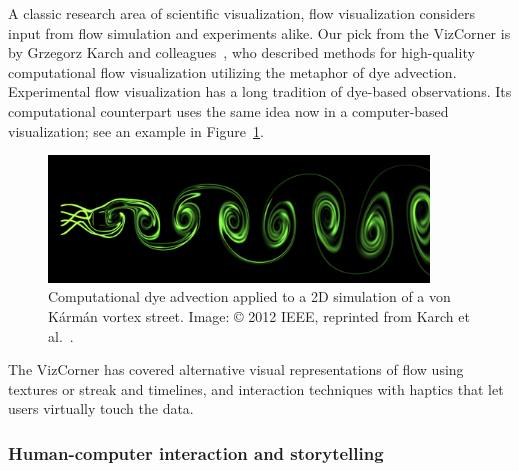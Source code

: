 \documentclass[10pt,journal,compsoc]{IEEEtran}
\begin{document}
A classic research area of scientific visualization, flow visualization considers input from flow simulation and experiments alike. Our pick from the VizCorner is by Grzegorz Karch and colleagues~\cite{Karch2012}, who described methods for high-quality computational flow visualization utilizing the metaphor of dye advection. Experimental flow visualization has a long tradition of dye-based observations. Its computational counterpart uses the same idea now in a computer-based visualization; see an example in Figure~\ref{fig:karman}. 

\begin{figure}
	\begin{center}	
		\includegraphics[width=0.9\textwidth]{karman_weno3.png}
		\caption{Computational dye advection applied to a 2D simulation of a von K{\'a}rm{\'a}n vortex street. Image: \copyright{} 2012 IEEE, reprinted from Karch et al.~\cite{Karch2012}.
  \label{fig:karman}}		
	\end{center}
\end{figure}

The VizCorner has covered alternative visual representations of flow using textures or streak and timelines, 
and interaction techniques with haptics that let users virtually touch the data.

\subsubsection*{Human-computer interaction and storytelling}

\end{document}
